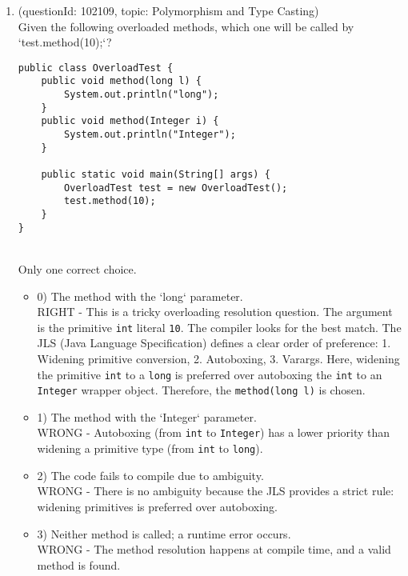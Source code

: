 \documentclass[12pt]{article}
\begin{document}
\begin{enumerate}[label=(\arabic*)]
\begin{itemize}
\end{itemize}
\item (questionId: 102109, topic: Polymorphism and Type Casting) \\ 
Given the following overloaded methods, which one will be called by `test.method(10);`?\n\begin{verbatim}
public class OverloadTest {
    public void method(long l) {
        System.out.println("long");
    }
    public void method(Integer i) {
        System.out.println("Integer");
    }
    
    public static void main(String[] args) {
        OverloadTest test = new OverloadTest();
        test.method(10);
    }
}
\end{verbatim}
\\ \noindent Only one correct choice. 
\begin{itemize}
\item 0) The method with the `long` parameter.
 \\ 
RIGHT - This is a tricky overloading resolution question. The argument is the primitive \verb|int| literal \verb|10|. The compiler looks for the best match. The JLS (Java Language Specification) defines a clear order of preference: 1. Widening primitive conversion, 2. Autoboxing, 3. Varargs. Here, widening the primitive \verb|int| to a \verb|long| is preferred over autoboxing the \verb|int| to an \verb|Integer| wrapper object. Therefore, the \verb|method(long l)| is chosen.

\item 1) The method with the `Integer` parameter.
 \\ 
WRONG - Autoboxing (from \verb|int| to \verb|Integer|) has a lower priority than widening a primitive type (from \verb|int| to \verb|long|).

\item 2) The code fails to compile due to ambiguity.
 \\ 
WRONG - There is no ambiguity because the JLS provides a strict rule: widening primitives is preferred over autoboxing.

\item 3) Neither method is called; a runtime error occurs.
 \\ 
WRONG - The method resolution happens at compile time, and a valid method is found.


\end{itemize}
\end{enumerate}
\end{document}
